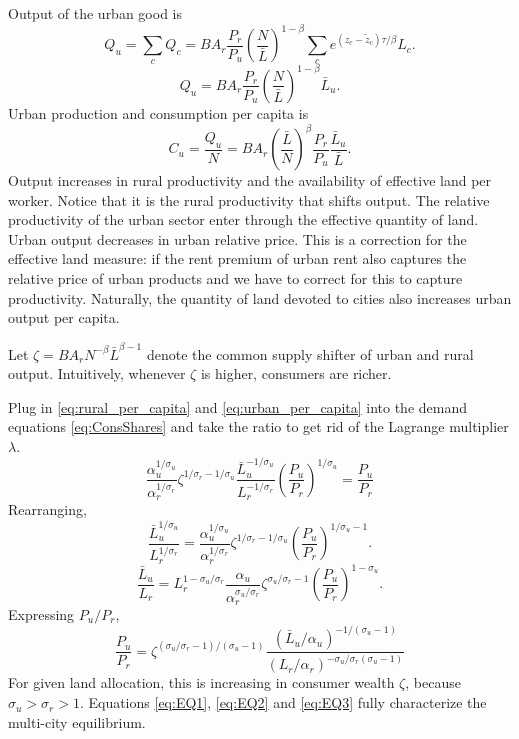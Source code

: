 \documentclass[12pt]{article}
\begin{document}
Output of the urban good is
\[
Q_u = \sum_c Q_c
= B A_r \frac{P_r}{P_u}
\left(\frac {N}
	{{\bar L}}
\right)^{1-\beta}
\sum_c e^{(z_c-\tilde z_c)\tau/\beta} L_c.
\]
\[
Q_u =  B A_r \frac{P_r}{P_u}
\left(\frac {N}
	{{\bar L}}
\right)^{1-\beta}
\bar L_u.
\]
Urban production and consumption per capita is
\begin{equation}\label{eq:urban_per_capita}
C_u=\frac {Q_u}{N} =
B A_r \left(\frac{{\bar L}}{N}\right)^{\beta}
 \frac{P_r}{P_u}
\frac {\bar L_u}
	{{\bar L}}
.
\end{equation}
Output increases in rural productivity and the availability of effective land per worker. Notice that it is the rural productivity that shifts output. The relative productivity of the urban sector enter through the effective quantity of land. Urban output decreases in urban relative price. This is a correction for the effective land measure: if the rent premium of urban rent also captures the relative price of urban products and we have to correct for this to capture productivity. Naturally, the quantity of land devoted to cities also increases urban output per capita.

Let $\zeta = B A_r N^{-\beta}{{\bar L}}^{\beta-1}$ denote the common supply shifter of urban and rural output. Intuitively, whenever $\zeta$ is higher, consumers are richer.

Plug in \eqref{eq:rural_per_capita} and \eqref{eq:urban_per_capita} into the demand equations \eqref{eq:ConsShares} and take the ratio to get rid of the Lagrange multiplier $\lambda$.
\[
\frac{\alpha_u^{1/\sigma_u}}{\alpha_r^{1/\sigma_r}}
\zeta^{1/\sigma_r-1/\sigma_u}
\frac {\bar L_u^{-1/\sigma_u}}
{L_r^{-1/\sigma_r}}
\left(\frac {P_u}{P_r}\right)^{1/\sigma_u}
= \frac {P_u}{P_r}
\]
Rearranging,
\[
\frac {\bar L_u^{1/\sigma_u}}
{L_r^{1/\sigma_r}}
=
\frac{\alpha_u^{1/\sigma_u}}{\alpha_r^{1/\sigma_r}}
\zeta^{1/\sigma_r-1/\sigma_u}
\left(\frac {P_u}{P_r}\right)^{1/\sigma_u-1}
.\]
\[
\frac {\bar L_u}
{L_r}
=
L_r^{1-\sigma_u/\sigma_r}
\frac{\alpha_u}{\alpha_r^{\sigma_u/\sigma_r}}
\zeta^{\sigma_u/\sigma_r-1}
\left(\frac {P_u}{P_r}\right)^{1-\sigma_u}
.\]
Expressing
 $P_u/P_r$,
\begin{equation}\label{eq:EQ3}\tag{iii}
\frac {P_u}{P_r}
=
\zeta^{(\sigma_u/\sigma_r-1)/(\sigma_u-1)}
\frac {(\bar L_u/\alpha_u)^{-1/(\sigma_u-1)}}
{(L_r/\alpha_r)^{-\sigma_u/\sigma_r(\sigma_u-1)}}
\end{equation}
For given land allocation, this is increasing in consumer wealth $\zeta$, because $\sigma_u>\sigma_r>1$. Equations \eqref{eq:EQ1}, \eqref{eq:EQ2} and \eqref{eq:EQ3} fully characterize the multi-city equilibrium.
\end{document}
